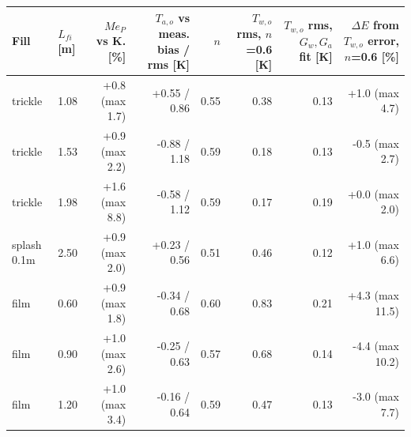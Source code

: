 \begin{tabular}{llrrrrrr}
\toprule
Fill & $L_{fi}$ [m] & $Me_P$ vs K. [\%] & $T_{a,o}$ vs meas. bias / rms [K] & $n$ & $T_{w,o}$ rms, $n$=0.6 [K] & $T_{w,o}$ rms, $G_w,G_a$ fit [K] & $\Delta E$ from $T_{w,o}$ error, $n$=0.6 [\%] \\
\midrule
trickle & 1.08 & +0.8 (max 1.7) & +0.55 / 0.86 & 0.55 & 0.38 & 0.13 & +1.0 (max 4.7) \\
trickle & 1.53 & +0.9 (max 2.2) & -0.88 / 1.18 & 0.59 & 0.18 & 0.13 & -0.5 (max 2.7) \\
trickle & 1.98 & +1.6 (max 8.8) & -0.58 / 1.12 & 0.59 & 0.17 & 0.19 & +0.0 (max 2.0) \\
splash 0.1m & 2.50 & +0.9 (max 2.0) & +0.23 / 0.56 & 0.51 & 0.46 & 0.12 & +1.0 (max 6.6) \\
film & 0.60 & +0.9 (max 1.8) & -0.34 / 0.68 & 0.60 & 0.83 & 0.21 & +4.3 (max 11.5) \\
film & 0.90 & +1.0 (max 2.6) & -0.25 / 0.63 & 0.57 & 0.68 & 0.14 & -4.4 (max 10.2) \\
film & 1.20 & +1.0 (max 3.4) & -0.16 / 0.64 & 0.59 & 0.47 & 0.13 & -3.0 (max 7.7) \\
\bottomrule
\end{tabular}
